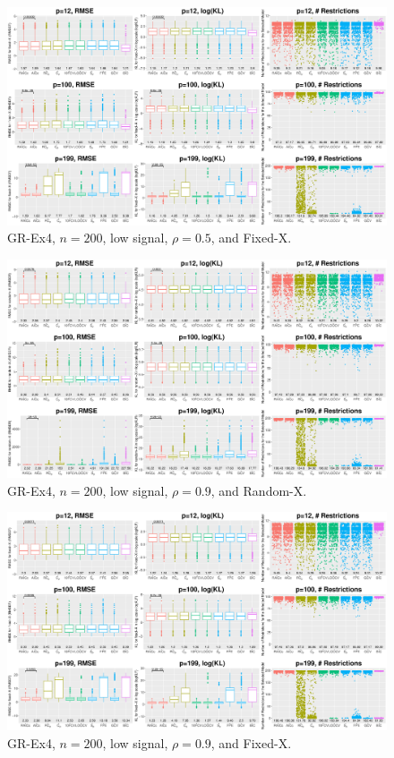\begin{figure}[!ht]
\centering
\includegraphics[width=\textwidth]{figures/supplement/fixedx_GR-Ex4_n200_lsnr_rho05.eps}
\caption{GR-Ex4, $n=200$, low signal, $\rho=0.5$, and Fixed-X.}
\end{figure}
\clearpage
\begin{figure}[!ht]
\centering
\includegraphics[width=\textwidth]{figures/supplement/randomx_GR-Ex4_n200_lsnr_rho09.eps}
\caption{GR-Ex4, $n=200$, low signal, $\rho=0.9$, and Random-X.}
\end{figure}
\begin{figure}[!ht]
\centering
\includegraphics[width=\textwidth]{figures/supplement/fixedx_GR-Ex4_n200_lsnr_rho09.eps}
\caption{GR-Ex4, $n=200$, low signal, $\rho=0.9$, and Fixed-X.}
\end{figure}
